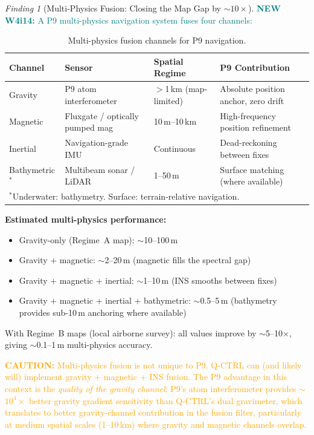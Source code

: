 \documentclass[11pt]{article}
\theoremstyle{definition}
\theoremstyle{remark}
\newtheorem{finding}[theorem]{Finding}
\newcommand{\caution}[1]{\textcolor{orange}{\textbf{CAUTION:} #1}}
\newcommand{\newfinding}[1]{\textcolor{teal}{\textbf{NEW W4i14:} #1}}
\begin{document}
\begin{finding}[Multi-Physics Fusion: Closing the Map Gap by $\sim$$10\times$]
\label{find:multi-physics}
\newfinding{A P9 multi-physics navigation system fuses four channels:}

\begin{table}[H]
\centering
\caption{Multi-physics fusion channels for P9 navigation.}
\label{tab:fusion-channels}
\begin{tabular}{@{}p{2.5cm}p{2.5cm}p{2.5cm}p{3cm}@{}}
\toprule
Channel & Sensor & Spatial Regime & P9 Contribution \\
\midrule
Gravity & P9 atom interferometer & $>$1\,km (map-limited) & Absolute position anchor, zero drift \\
Magnetic & Fluxgate / optically pumped mag & 10\,m--10\,km & High-frequency position refinement \\
Inertial & Navigation-grade IMU & Continuous & Dead-reckoning between fixes \\
Bathymetric$^*$ & Multibeam sonar / LiDAR & 1--50\,m & Surface matching (where available) \\
\bottomrule
\multicolumn{4}{l}{\small $^*$Underwater: bathymetry. Surface: terrain-relative navigation.}
\end{tabular}
\end{table}

\textbf{Estimated multi-physics performance:}
\begin{itemize}[nosep]
\item Gravity-only (Regime~A map): $\sim$10--100\,m
\item Gravity + magnetic: $\sim$2--20\,m (magnetic fills the spectral gap)
\item Gravity + magnetic + inertial: $\sim$1--10\,m (INS smooths between fixes)
\item Gravity + magnetic + inertial + bathymetric: $\sim$0.5--5\,m
  (bathymetry provides sub-10\,m anchoring where available)
\end{itemize}

With Regime~B maps (local airborne survey): all values improve by
$\sim$5--10$\times$, giving $\sim$0.1--1\,m multi-physics accuracy.

\caution{Multi-physics fusion is not unique to P9. Q-CTRL can (and
likely will) implement gravity + magnetic + INS fusion. The P9
advantage in this context is the \emph{quality of the gravity channel}:
P9's atom interferometer provides $\sim$$10^4\times$ better gravity
gradient sensitivity than Q-CTRL's dual gravimeter, which translates
to better gravity-channel contribution in the fusion filter, particularly
at medium spatial scales (1--10\,km) where gravity and magnetic channels
overlap.}
\end{finding}
\end{document}
